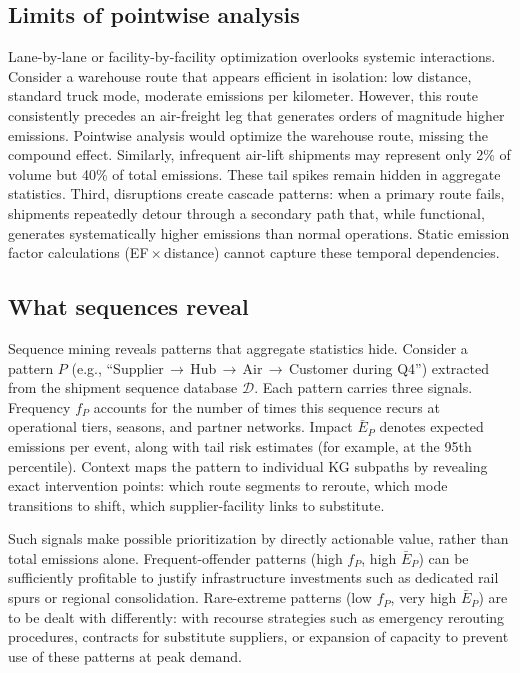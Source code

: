 \documentclass[conference]{IEEEtran}
\begin{document}
\subsection{Limits of pointwise analysis}
Lane-by-lane or facility-by-facility optimization overlooks systemic interactions. Consider a warehouse route that appears efficient in isolation: low distance, standard truck mode, moderate emissions per kilometer. However, this route consistently precedes an air-freight leg that generates orders of magnitude higher emissions. Pointwise analysis would optimize the warehouse route, missing the compound effect. Similarly, infrequent air-lift shipments may represent only 2\% of volume but 40\% of total emissions. These tail spikes remain hidden in aggregate statistics. Third, disruptions create cascade patterns: when a primary route fails, shipments repeatedly detour through a secondary path that, while functional, generates systematically higher emissions than normal operations. Static emission factor calculations (EF\,$\times$\,distance) cannot capture these temporal dependencies.

\subsection{What sequences reveal}
Sequence mining reveals patterns that aggregate statistics hide. Consider a pattern $P$ (e.g., ``Supplier\,$\to$\,Hub\,$\to$\,Air\,$\to$\,Customer during Q4'') extracted from the shipment sequence database $\mathcal{D}$. Each pattern carries three signals. Frequency $f_P$ accounts for the number of times this sequence recurs at operational tiers, seasons, and partner networks. Impact $\bar{E}_P$ denotes expected emissions per event, along with tail risk estimates (for example, at the 95th percentile). Context maps the pattern to individual KG subpaths by revealing exact intervention points: which route segments to reroute, which mode transitions to shift, which supplier-facility links to substitute.

Such signals make possible prioritization by directly actionable value, rather than total emissions alone. Frequent-offender patterns (high $f_P$, high $\bar{E}_P$) can be sufficiently profitable to justify infrastructure investments such as dedicated rail spurs or regional consolidation. Rare-extreme patterns (low $f_P$, very high $\bar{E}_P$) are to be dealt with differently: with recourse strategies such as emergency rerouting procedures, contracts for substitute suppliers, or expansion of capacity to prevent use of these patterns at peak demand.
\end{document}
